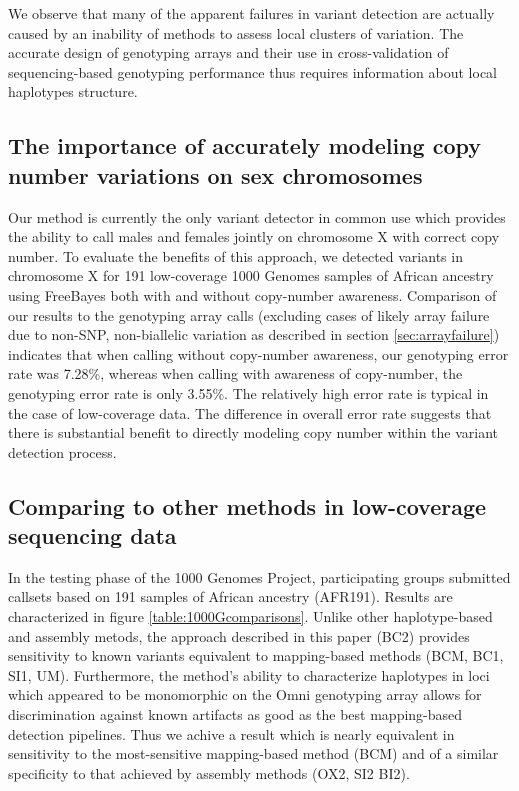 \documentclass{article}
\begin{document}
We observe that many of the apparent failures in variant detection are actually caused by an inability of methods to assess local clusters of variation.  The accurate design of genotyping arrays and their use in cross-validation of sequencing-based genotyping performance thus requires information about local haplotypes structure.

\subsection{The importance of accurately modeling copy number variations on sex chromosomes}

Our method is currently the only variant detector in common use which provides the ability to call males and females jointly on chromosome X with correct copy number.  To evaluate the benefits of this approach, we detected variants in chromosome X for 191 low-coverage 1000 Genomes samples of African ancestry using FreeBayes both with and without copy-number awareness.  Comparison of our results to the genotyping array calls (excluding cases of likely array failure due to non-SNP, non-biallelic variation as described in section \ref{sec:arrayfailure}) indicates that when calling without copy-number awareness, our genotyping error rate was 7.28\%, whereas when calling with awareness of copy-number, the genotyping error rate is only 3.55\%.  The relatively high error rate is typical in the case of low-coverage data.  The difference in overall error rate suggests that there is substantial benefit to directly modeling copy number within the variant detection process.


\subsection{Comparing to other methods in low-coverage sequencing data}
\label{sec:1000Gcomparisons}

In the testing phase of the 1000 Genomes Project, participating groups submitted callsets based on 191 samples of African ancestry (AFR191).  Results are characterized in figure \ref{table:1000Gcomparisons}.  Unlike other haplotype-based and assembly metods, the approach described in this paper (BC2) provides sensitivity to known variants equivalent to mapping-based methods (BCM, BC1, SI1, UM).  Furthermore, the method's ability to characterize haplotypes in loci which appeared to be monomorphic on the Omni genotyping array allows for discrimination against known artifacts as good as the best mapping-based detection pipelines.  Thus we achive a result which is nearly equivalent in sensitivity to the most-sensitive mapping-based method (BCM) and of a similar specificity to that achieved by assembly methods (OX2, SI2 BI2).
\end{document}
